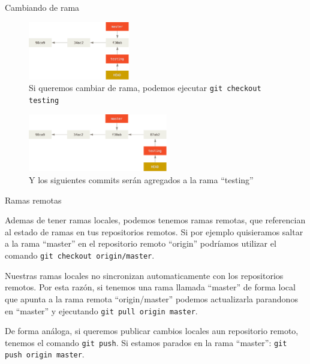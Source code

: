 \documentclass{beamer}
\begin{document}
\begin{frame}{Cambiando de rama}

    \begin{figure}[ht]
        \begin{center}
            \includegraphics[height=1in]{head-to-testing.png}
        \end{center}
        \caption{Si queremos cambiar de rama, podemos ejecutar \texttt{git checkout testing}}
    \end{figure}
    \begin{figure}[ht]
        \begin{center}
            \includegraphics[height=1in]{advance-testing.png}
        \end{center}
        \caption{Y los siguientes commits serán agregados a la rama ``testing''}
    \end{figure}

\end{frame}

\begin{frame}{Ramas remotas}

    Ademas de tener ramas locales, podemos tenemos ramas remotas, que referencian al estado de ramas en tus repositorios remotos.
    Si por ejemplo quisieramos saltar a la rama ``master'' en el repositorio remoto ``origin'' podríamos utilizar el comando \texttt{git checkout origin/master}.

    \vspace{1em}

    Nuestras ramas locales no sincronizan automaticamente con los repositorios remotos. Por esta razón, si tenemos una rama llamada ``master'' de forma local que
    apunta a la rama remota ``origin/master'' podemos actualizarla parandonos en ``master'' y ejecutando \texttt{git pull origin master}.

    \vspace{1em}

    De forma análoga, si queremos publicar cambios locales aun repositorio remoto, tenemos el comando \texttt{git push}. Si estamos parados en la rama ``master'':
    \texttt{git push origin master}.

\end{frame}
\end{document}
